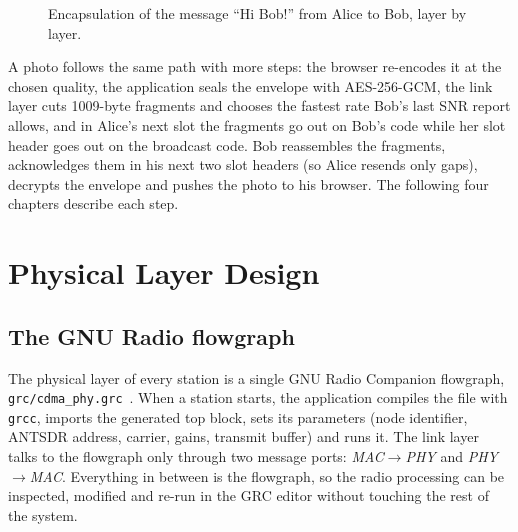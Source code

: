 \documentclass[11pt,a4paper,oneside]{report}
\newcommand{\code}[1]{\texttt{\small #1}}
\begin{document}
\begin{figure}[htbp]
\centering
{}
\caption{Encapsulation of the message ``Hi Bob!'' from Alice to Bob, layer by layer.}\label{fig:hibob}
\end{figure}

A photo follows the same path with more steps: the browser re-encodes it at the chosen quality, the
application seals the envelope with AES-256-GCM, the link layer cuts \num{1009}-byte fragments and
chooses the fastest rate Bob's last SNR report allows, and in Alice's next slot the fragments go
out on Bob's code while her slot header goes out on the broadcast code. Bob reassembles the
fragments, acknowledges them in his next two slot headers (so Alice resends only gaps), decrypts the
envelope and pushes the photo to his browser. The following four chapters describe each step.
\chapter{Physical Layer Design}\label{ch:phy}

\section{The GNU Radio flowgraph}\label{sec:grc}
The physical layer of every station is a single GNU Radio Companion flowgraph,
\code{grc/cdma\_phy.grc}~\cite{gnuradio}. When a station starts, the application compiles the file
with \code{grcc}, imports the generated top block, sets its parameters (node identifier, ANTSDR
address, carrier, gains, transmit buffer) and runs it. The link layer talks to the flowgraph only
through two message ports: \emph{MAC$\to$PHY} and \emph{PHY$\to$MAC}. Everything in between is the
flowgraph, so the radio processing can be inspected, modified and re-run in the GRC editor without
touching the rest of the system.
\end{document}

